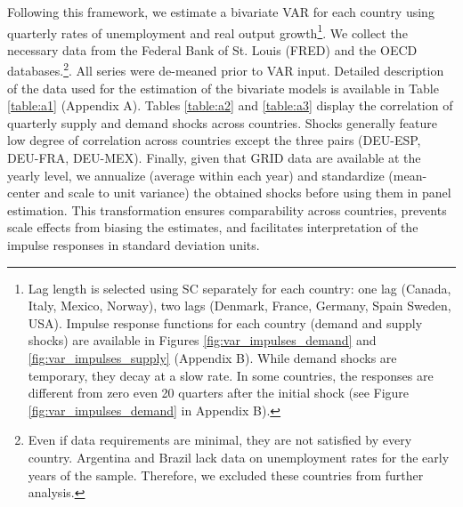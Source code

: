 \documentclass[12pt, a4paper]{article}
\begin{document}
Following  this framework, we estimate a bivariate VAR for each country using quarterly rates of unemployment and real output growth\footnote{Lag length is selected using SC separately for each country: one lag (Canada, Italy, Mexico, Norway), two lags (Denmark, France, Germany, Spain Sweden, USA). Impulse response functions for each country (demand and supply shocks) are available in Figures \ref{fig:var_impulses_demand} and \ref{fig:var_impulses_supply} (Appendix B). While demand shocks are temporary, they decay at a slow rate. In some countries, the responses are different from zero even 20 quarters after the initial shock (see Figure \ref{fig:var_impulses_demand} in Appendix B).}. We collect the necessary data from the Federal Bank of St. Louis (FRED) and the OECD databases.\footnote{Even if data requirements are minimal, they are not satisfied by every country. Argentina and Brazil lack data on unemployment rates for the early years of the sample. Therefore, we excluded these countries from further analysis.}. All series were de-meaned prior to VAR input. Detailed description of the data used for the estimation of the bivariate models is available in Table \ref{table:a1} (Appendix A). Tables \ref{table:a2} and \ref{table:a3} display the correlation of quarterly supply and demand shocks across countries. Shocks generally feature low degree of correlation across countries except the three pairs (DEU-ESP, DEU-FRA, DEU-MEX). Finally, given that GRID data are available at the yearly level, we annualize (average within each year) and standardize (mean-center and scale to unit variance) the obtained shocks before using them in panel estimation. This transformation ensures comparability across countries, prevents scale effects from biasing the estimates, and facilitates interpretation of the impulse responses in standard deviation units.
\end{document}
